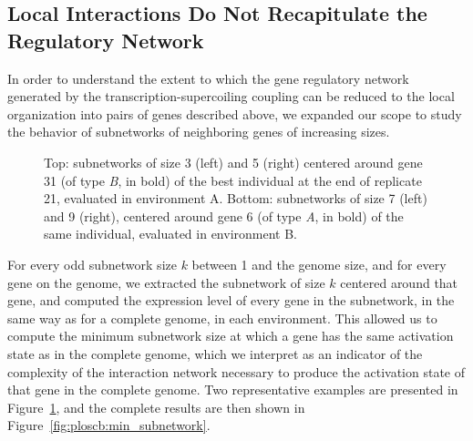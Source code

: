 \subsection{Local Interactions Do Not Recapitulate the Regulatory Network}

In order to understand the extent to which the gene regulatory network generated by the transcription-supercoiling coupling can be reduced to the local organization into pairs of genes described above, we expanded our scope to study the behavior of subnetworks of neighboring genes of increasing sizes.

\begin{figure}[H]
  \centering
  \begin{elasticrow}[width=\linewidth]
	\end{elasticrow}
  \begin{elasticrow}[width=\linewidth]
	\end{elasticrow}
  \caption[Example minimal subnetworks needed for gene inhibition in an evolved individual]{Top: subnetworks of size 3 (left) and 5 (right) centered around gene 31 (of type \emph{B}, in bold) of the best individual at the end of replicate 21, evaluated in environment A.
  Bottom: subnetworks of size 7 (left) and 9 (right), centered around gene 6 (of type \emph{A}, in bold) of the same individual, evaluated in environment B.
  }
  \label{fig:ploscb:subnetwork_examples}
\end{figure}

For every odd subnetwork size $k$ between 1 and the genome size, and for every gene on the genome, we extracted the subnetwork of size $k$ centered around that gene, and computed the expression level of every gene in the subnetwork, in the same way as for a complete genome, in each environment.
This allowed us to compute the minimum subnetwork size at which a gene has the same activation state as in the complete genome, which we interpret as an indicator of the complexity of the interaction network necessary to produce the activation state of that gene in the complete genome.
Two representative examples are presented in Figure~\ref{fig:ploscb:subnetwork_examples}, and the complete results are then shown in Figure~\ref{fig:ploscb:min_subnetwork}.

